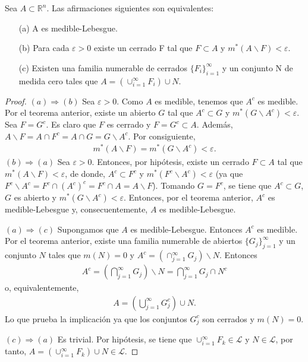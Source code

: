 \begin{teo}
    Sea $A \subset \mathbb{R}^n$. Las afirmaciones siguientes son equivalentes:
    \begin{enumerate}
        \item[(a)] A es medible-Lebesgue.
        \item[(b)] Para cada $\varepsilon > 0$ existe un cerrado F tal que $F \subset A$ y $m^*(A \backslash F) < \varepsilon$.
        \item[(c)] Existen una familia numerable de cerrados $\{F_i\}_{i=1}^{\infty}$ y un conjunto N de medida cero tales que $A = (\cup_{i=1}^{\infty}{F_i}) \cup N$.
    \end{enumerate}
\end{teo}

\begin{proof}
    $(a) \Longrightarrow (b)$ Sea $\varepsilon > 0$. Como $A$ es medible, tenemos que $A^c$ es medible. Por el teorema anterior, existe un abierto $G$ tal que $A^c \subset G$ y $m^*(G \backslash A^c) < \varepsilon$. Sea $F = G^c$. Es claro que $F$ es cerrado y $F = G^c \subset A$. Además, $A \backslash F = A \cap F^c = A \cap G = G \backslash A^c$. Por consiguiente,
    \begin{align*}
        m^*(A \backslash F) = m^*(G \backslash A^c) < \varepsilon.
    \end{align*}
    $(b) \Longrightarrow (a)$ Sea $\varepsilon > 0$. Entonces, por hipótesis, existe un cerrado $F \subset A$ tal que $m^*(A \backslash F) < \varepsilon$, de donde, $A^c \subset  F^c$ y $m^*(F^c \backslash A^c) < \varepsilon$ (ya que $F^c \backslash A^c = F^c \cap (A^c)^c = F^c \cap A = A \backslash F$). Tomando $G = F^c$, se tiene que $A^c \subset G$, $G$ es abierto y $m^*(G \backslash A^c) < \varepsilon$. Entonces, por el teorema anterior, $A^c$ es medible-Lebesgue y, consecuentemente, $A$ es medible-Lebesgue.

    $(a) \Longrightarrow (c)$ Supongamos que $A$ es medible-Lebesgue. Entonces $A^c$ es medible. Por el teorema anterior, existe una familia numerable de abiertos $\{G_j\}_{j=1}^{\infty}$ y un conjunto $N$ tales que $m(N) = 0$ y $A^c = (\cap_{j=1}^{\infty}{G_j}) \backslash N$. Entonces
    \begin{align*}
        A^c = \left( \bigcap_{j=1}^{\infty}{G_j}\right) \backslash N = \bigcap_{j=1}^{\infty}{G_j \cap N^c}
    \end{align*}
    o, equivalentemente,
    \begin{align*}
        A = \left( \bigcup_{j=1}^{\infty}{G_j^c}\right) \cup N.
    \end{align*}
    Lo que prueba la implicación ya que los conjuntos $G_j^c$ son cerrados y $m(N) = 0$.

    $(c) \Longrightarrow (a)$ Es trivial. Por hipótesis, se tiene que $\cup_{i=1}^{\infty}{F_k} \in \mathcal{L}$ y $N \in \mathcal{L}$, por tanto, $A = (\cup_{i=1}^{\infty}{F_k} )\cup N \in \mathcal{L}$.
\end{proof}

